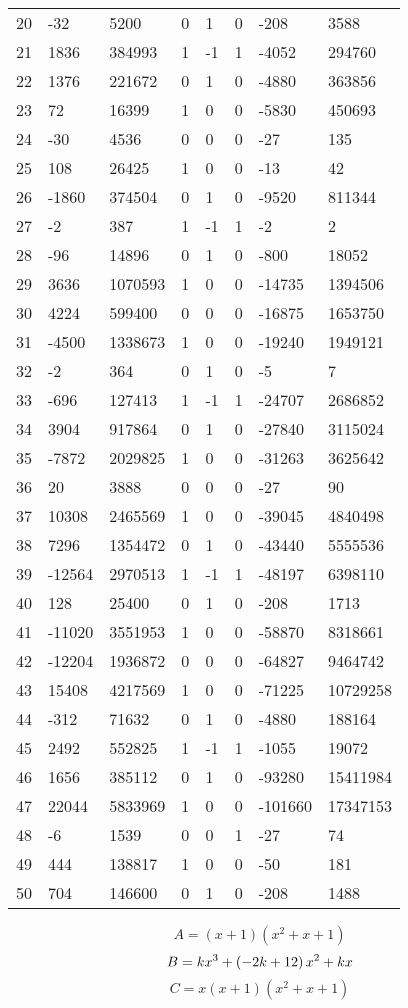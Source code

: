 \documentclass{amsart}
\begin{document}
\begin{longtable}{|l|l|l|lllll|}
20&-32&5200&0&1&0&-208&3588\\
21&1836&384993&1&-1&1&-4052&294760\\
22&1376&221672&0&1&0&-4880&363856\\
23&72&16399&1&0&0&-5830&450693\\
24&-30&4536&0&0&0&-27&135\\
25&108&26425&1&0&0&-13&42\\
26&-1860&374504&0&1&0&-9520&811344\\
27&-2&387&1&-1&1&-2&2\\
28&-96&14896&0&1&0&-800&18052\\
29&3636&1070593&1&0&0&-14735&1394506\\
30&4224&599400&0&0&0&-16875&1653750\\
31&-4500&1338673&1&0&0&-19240&1949121\\
32&-2&364&0&1&0&-5&7\\
33&-696&127413&1&-1&1&-24707&2686852\\
34&3904&917864&0&1&0&-27840&3115024\\
35&-7872&2029825&1&0&0&-31263&3625642\\
36&20&3888&0&0&0&-27&90\\
37&10308&2465569&1&0&0&-39045&4840498\\
38&7296&1354472&0&1&0&-43440&5555536\\
39&-12564&2970513&1&-1&1&-48197&6398110\\
40&128&25400&0&1&0&-208&1713\\
41&-11020&3551953&1&0&0&-58870&8318661\\
42&-12204&1936872&0&0&0&-64827&9464742\\
43&15408&4217569&1&0&0&-71225&10729258\\
44&-312&71632&0&1&0&-4880&188164\\
45&2492&552825&1&-1&1&-1055&19072\\
46&1656&385112&0&1&0&-93280&15411984\\
47&22044&5833969&1&0&0&-101660&17347153\\
48&-6&1539&0&0&1&-27&74\\
49&444&138817&1&0&0&-50&181\\
50&704&146600&0&1&0&-208&1488\\
\hline
\end{longtable}
$$A=(x
 + 1)(x^2
 + x
 + 1)$$
$$B=k\*x^3
 + \left(-2\*k
 + 12\right) \*x^2
 + k\*x$$
$$C=x(x
 + 1)(x^2
 + x
 + 1)$$
\end{document}
